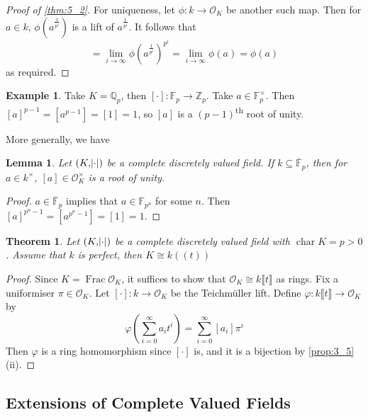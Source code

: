\documentclass[11pt]{article}
\theoremstyle{definition}
\newtheorem*{example}{Example}
\theoremstyle{plain}
\newtheorem{theorem}[definition]{Theorem}
\newtheorem{lemma}[definition]{Lemma}
\theoremstyle{remark}
\DeclareMathOperator{\Frac}{Frac}
\DeclareMathOperator{\Char}{char}
\newcommand{\FF}{\mathbb{F}}
\newcommand{\ZZ}{\mathbb{Z}}
\newcommand{\QQ}{\mathbb{Q}}
\newcommand{\cO}{\mathcal{O}}
\begin{document}
\begin{proof}[Proof of \autoref{thm:5_2}]
    For uniqueness, let $\phi : k \to \cO_K$ be another such map. Then for $a \in k$, $\phi(a^\frac{1}{p^i})$ is a lift of $a^\frac{1}{p^i}$. It follows that
    \begin{equation*}
        [a] = \lim_{i \to \infty} \phi(a^\frac{1}{p^i})^{p^i} = \lim_{i \to \infty} \phi(a) = \phi(a)
    \end{equation*}
    as required.
\end{proof}

\begin{example}
    Take $K = \QQ_p$, then $[\cdot] : \FF_p \to \ZZ_p$. Take $a \in \FF_p^\times$. Then $[a]^{p-1} = [a^{p-1}] = [1] = 1$, so $[a]$ is a $(p-1)$\textsuperscript{th} root of unity.
\end{example}

\noindent More generally, we have


\begin{lemma}\label{lem:5_6}
    Let $(K, \abs{\cdot})$ be a complete discretely valued field. If $k \subseteq \overline{\FF}_p$, then for $a \in k^\times$, $[a] \in \cO_K^\times$ is a root of unity.
\end{lemma}
\begin{proof}
    $a \in \overline{\FF}_p$ implies that $a \in \FF_{p^n}$ for some $n$. Then $[a]^{p^n-1} = [a^{p^n-1}] = [1] = 1$.
\end{proof}

\begin{theorem}\label{thm:5_7}
    Let $(K, \abs{\cdot})$ be a complete discretely valued field with $\Char K = p > 0$ . Assume that $k$ is perfect, then $K \cong k((t))$
\end{theorem}
\begin{proof}
    Since $K = \Frac{\cO_K}$, it suffices to show that $\cO_K \cong k\llbracket t \rrbracket$ as rings. Fix a uniformiser $\pi \in \cO_K$. Let $[\cdot] : k \to \cO_K$ be the Teichm\"uller lift. Define $\varphi : k\llbracket t \rrbracket \to \cO_K$ by
    \begin{equation*}
        \varphi\left(\sum_{i=0}^\infty a_i t^i\right) = \sum_{i=0}^\infty [a_i] \pi^i
    \end{equation*}
    Then $\varphi$ is a ring homomorphism since $[\cdot]$ is, and it is a bijection by \autoref{prop:3_5} (ii).
\end{proof}

\subsection{Extensions of Complete Valued Fields}
\end{document}
